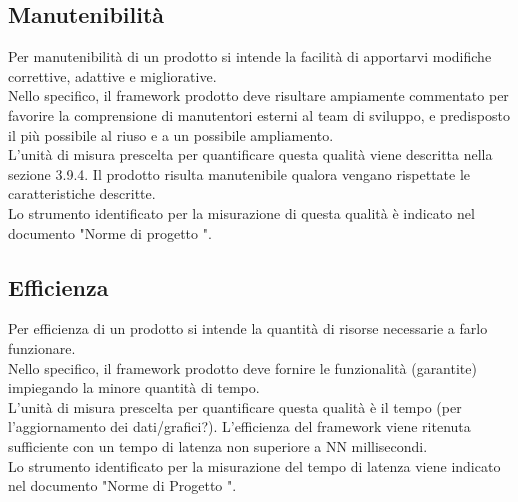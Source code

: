 	\subsection{Manutenibilità}
		Per manutenibilità di un prodotto si intende la facilità di apportarvi modifiche correttive, adattive e migliorative.\\
		Nello specifico, il framework prodotto deve risultare ampiamente commentato per favorire la comprensione di manutentori esterni al team di sviluppo, e predisposto il più possibile al riuso e a un possibile ampliamento.\\
		L'unità di misura prescelta per quantificare questa qualità viene descritta nella sezione 3.9.4. Il prodotto risulta manutenibile qualora vengano rispettate le caratteristiche descritte.\\
		Lo strumento identificato per la misurazione di questa qualità è indicato nel documento "Norme di progetto \lastversion".
	\subsection{Efficienza}
		Per efficienza di un prodotto si intende la quantità di risorse necessarie a farlo funzionare.\\
		Nello specifico, il framework prodotto deve fornire le funzionalità (garantite) impiegando la minore quantità di tempo.\\
		L'unità di misura prescelta per quantificare questa qualità è il tempo (per l'aggiornamento dei dati/grafici?). L'efficienza del framework viene ritenuta sufficiente con un tempo di latenza non superiore a NN millisecondi.\\
		Lo strumento identificato per la misurazione del tempo di latenza viene indicato nel documento "Norme di Progetto \lastversion".
